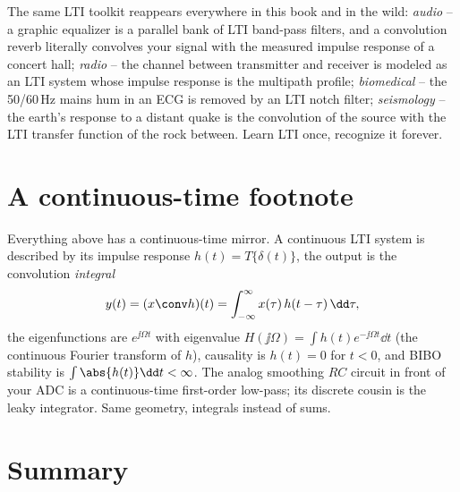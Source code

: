 \begin{applicationbox}
The same LTI toolkit reappears everywhere in this book and in the wild:
\emph{audio} -- a graphic equalizer is a parallel bank of LTI band-pass filters,
and a convolution reverb literally convolves your signal with the measured
impulse response of a concert hall; \emph{radio} -- the channel between
transmitter and receiver is modeled as an LTI system whose impulse response is
the multipath profile; \emph{biomedical} -- the 50/60\,Hz mains hum in an ECG is
removed by an LTI notch filter; \emph{seismology} -- the earth's response to a
distant quake is the convolution of the source with the LTI transfer function of
the rock between. Learn LTI once, recognize it forever.
\end{applicationbox}

\section{A continuous-time footnote}
\label{ch12:ct}

Everything above has a continuous-time mirror. A continuous LTI system is
described by its impulse response $h(t)=T\{\delta(t)\}$, the output is the
convolution \emph{integral}
\[
  y(t) = (x\conv h)(t) = \int_{-\infty}^{\infty} x(\tau)\,h(t-\tau)\,\dd\tau,
\]
the eigenfunctions are $e^{\jj\Omega t}$ with eigenvalue
$H(\jj\Omega)=\int h(t)e^{-\jj\Omega t}\dd t$ (the continuous Fourier transform of
$h$), causality is $h(t)=0$ for $t<0$, and BIBO stability is
$\int\abs{h(t)}\dd t<\infty$. The analog smoothing $RC$ circuit in front of your
ADC is a continuous-time first-order low-pass; its discrete cousin is the leaky
integrator. Same geometry, integrals instead of sums.

\section{Summary}
\label{ch12:summary}

